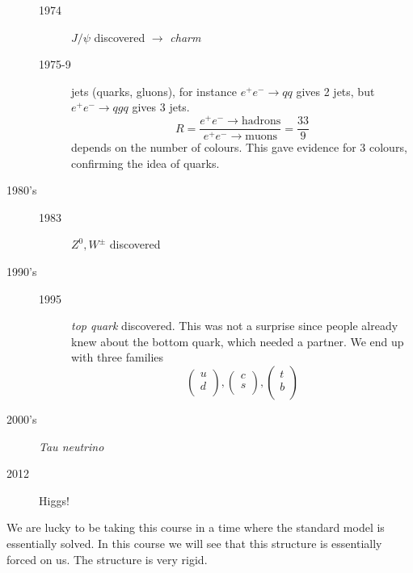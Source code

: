 \begin{description}
\begin{description}
\begin{itemize}
\begin{figure}[tbhp]
	        \label{fig:l3f3}
	      \end{figure}
	  \end{itemize}
	\item[1974] $J / \psi$ discovered $\rightarrow$ \emph{charm}
	\item[1975-9] jets (quarks, gluons), for instance $e^+ e^- \to qq$ gives 2 jets, but $e^+ e^- \to q g q$ gives 3 jets.
	  \begin{equation}
	    R = \frac{e^+ e^- \to \text{hadrons}}{e^+ e^- \to \text{muons}} = \frac{33}{9}
	  \end{equation}
	  depends on the number of colours. This gave evidence for $3$ colours, confirming the idea of quarks.
      \end{description}
  \item[1980's]
    \begin{description}
      \item[1983] $Z^0, W^{\pm}$ discovered
    \end{description}
  \item[1990's]
    \begin{description}
      \item[1995] \emph{top quark} discovered. This was not a surprise since people already knew about the bottom quark, which needed a partner. We end up with three families
	\begin{equation}
	  \begin{pmatrix}
	  u \\
	  d \\
	  \end{pmatrix},
	  \begin{pmatrix}
	  c \\
	  s \\
	  \end{pmatrix},
	  \begin{pmatrix}
	  t \\
	  b \\
	  \end{pmatrix}
	\end{equation}
    \end{description}
  \item[2000's] \emph{Tau neutrino}
  \item[2012] Higgs!
\end{description}

We are lucky to be taking this course in a time where the standard model is essentially solved. In this course we will see that this structure is essentially forced on us. The structure is very rigid.

